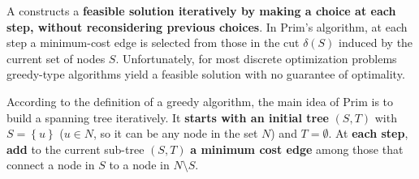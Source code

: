\highspace
A  constructs a \textbf{feasible solution iteratively by making a  choice at each step, without reconsidering previous choices}. In Prim's algorithm, at each step a minimum-cost edge is selected from those in the cut $\delta\left(S\right)$ induced by the current set of nodes $S$. Unfortunately, for most discrete optimization problems greedy-type algorithms yield a feasible solution with no guarantee of optimality.

\highspace
According to the definition of a greedy algorithm, the main idea of Prim is to build a spanning tree iteratively. It \textbf{starts with an initial tree} $\left(S,T\right)$ with $S = \left\{u\right\}$ ($u \in N$, so it can be any node in the set $N$) and $T = \emptyset$. At \textbf{each step}, \textbf{add} to the current sub-tree $\left(S,T\right)$ \textbf{a minimum cost edge} among those that connect a node in $S$ to a node in $N \setminus S$.


